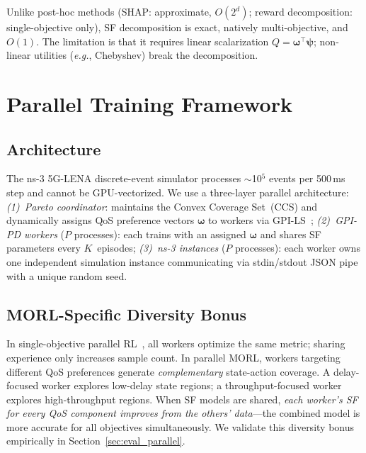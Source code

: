 \documentclass[conference]{IEEEtran}
\newcommand{\eg}{\textit{e.g.}}
\newcommand{\vomega}{\boldsymbol{\omega}}
\newcommand{\vpsi}{\boldsymbol{\psi}}
\begin{document}
Unlike post-hoc methods (SHAP: approximate, $O(2^d)$; reward decomposition: single-objective only), SF decomposition is exact, natively multi-objective, and $O(1)$.
The limitation is that it requires linear scalarization $Q = \vomega^\top\vpsi$; non-linear utilities (\eg, Chebyshev) break the decomposition.

\section{Parallel Training Framework}\label{sec:parallel}

\subsection{Architecture}

The ns-3 5G-LENA discrete-event simulator processes $\sim$10$^5$ events per 500\,ms step and cannot be GPU-vectorized.
We use a three-layer parallel architecture:
\emph{(1)~Pareto coordinator}: maintains the Convex Coverage Set~(CCS) and dynamically assigns QoS preference vectors $\vomega$ to workers via GPI-LS~\cite{gpipd};
\emph{(2)~GPI-PD workers} ($P$ processes): each trains with an assigned $\vomega$ and shares SF parameters every $K$~episodes;
\emph{(3)~ns-3 instances} ($P$ processes): each worker owns one independent simulation instance communicating via stdin/stdout JSON pipe with a unique random seed.

\subsection{MORL-Specific Diversity Bonus}\label{sec:diversity}

In single-objective parallel RL~\cite{apex,impala}, all workers optimize the same metric; sharing experience only increases sample count.
In parallel MORL, workers targeting different QoS preferences generate \emph{complementary} state-action coverage.
A delay-focused worker explores low-delay state regions; a throughput-focused worker explores high-throughput regions.
When SF models are shared, \emph{each worker's SF for every QoS component improves from the others' data}---the combined model is more accurate for all objectives simultaneously.
We validate this diversity bonus empirically in Section~\ref{sec:eval_parallel}.

\end{document}
